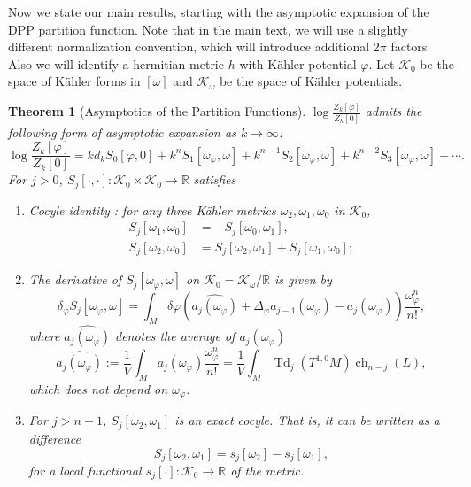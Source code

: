 \documentclass[12pt,reqno,a4paper]{amsart}
\numberwithin{equation}{section}
\DeclareMathOperator{\Td}{Td}
\DeclareMathOperator{\ch}{ch}
\newtheorem{maintheo}{{\sc Theorem}}
\theoremstyle{remark}
\theoremstyle{dotless}
\begin{document}
Now we state our main results, starting with the asymptotic expansion of the DPP partition function. Note that in the main text, we will use a slightly different normalization convention, which will introduce additional $2\pi$ factors. Also we will identify a hermitian metric $h$ with K\"ahler potential $\varphi$. Let $\mathcal{K}_0$ be the space of K\"ahler forms in $[\omega]$ and $\mathcal{K}_\omega$ be the space of K\"ahler potentials.

\begin{maintheo}[Asymptotics of the Partition Functions]\label{m1}
$\log \frac{Z_k[\varphi]}{Z_k[0]}$ admits the following form of asymptotic expansion as $k\rightarrow\infty$:
\begin{equation}\label{ver2}
\log \frac{Z_k[\varphi]}{Z_k[0]}=kd_{k}S_0[\varphi,0]+k^{n}S_1[\omega_\varphi,\omega]+k^{n-1}S_2[\omega_\varphi,\omega]+k^{n-2}S_3[\omega_\varphi,\omega]+\cdots.
\end{equation}
For $j>0$, $S_j[\cdot,\cdot]:\mathcal{K}_0\times\mathcal{K}_0\rightarrow\mathbb{R}$ satisfies
\begin{enumerate}
    \item Cocyle identity : for any three K\"ahler metrics $\omega_2, \omega_1, \omega_0$ in $\mathcal{K}_0$,
    \begin{align*}
S_j[\omega_1,\omega_0]&=-S_j[\omega_0,\omega_1],\\   
S_j[\omega_2,\omega_0]&=S_j[\omega_2,\omega_1]+S_j[\omega_1,\omega_0];
    \end{align*}
    \item The derivative of $S_j[\omega_\varphi,\omega]$ on $\mathcal{K}_0=\mathcal{K}_\omega/\mathbb{R}$ is given by
\begin{equation}\label{firstvar}
\delta_\varphi S_j[\omega_\varphi,\omega]=\int_M \delta\varphi\left( \widehat{a_j(\omega_\varphi)}+\Delta_\varphi a_{j-1}(\omega_\varphi)-a_{j}(\omega_\varphi) \right) \frac{\omega_\varphi^n}{n!},
\end{equation}
where $\widehat{a_j(\omega_\varphi)}$ denotes the average of $a_j(\omega_\varphi)$
\begin{equation*}
\widehat{a_j(\omega_\varphi)}:=\frac{1}{V}\int_M a_j(\omega_\varphi)\frac{\omega_\varphi^n}{n!}=\frac{1}{V}\int_M \Td_j(T^{1,0}M)\ch_{n-j}(L),
\end{equation*}
which does not depend on $\omega_\varphi$.
    \item For $j>n+1$, $S_j[\omega_2,\omega_1]$ is an exact cocyle. That is, it can be written as a difference
\begin{equation*}
S_j[\omega_2,\omega_1]=s_j[\omega_2]-s_j[\omega_1],
\end{equation*}
for a local functional $s_j[\cdot] : \mathcal{K}_0\rightarrow\mathbb{R}$ of the metric.
\end{enumerate}
\end{maintheo}
\end{document}
